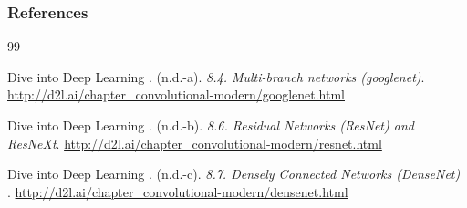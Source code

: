 \documentclass[11pt,compress,t,notes=noshow, xcolor=table]{beamer}
\begin{document}
\begin{vbframe}
\frametitle{References}
\footnotesize{
\begin{thebibliography}{99}

 Dive into Deep Learning . (n.d.-a). \textit{8.4. Multi-branch networks (googlenet)}. \url{http://d2l.ai/chapter_convolutional-modern/googlenet.html}

 Dive into Deep Learning . (n.d.-b). \textit{8.6. Residual Networks (ResNet) and ResNeXt}. \url{http://d2l.ai/chapter_convolutional-modern/resnet.html}

 Dive into Deep Learning . (n.d.-c). \textit{8.7. Densely Connected Networks (DenseNet)
}. \url{http://d2l.ai/chapter_convolutional-modern/densenet.html}


\end{thebibliography}}
\end{vbframe}
\end{document}
